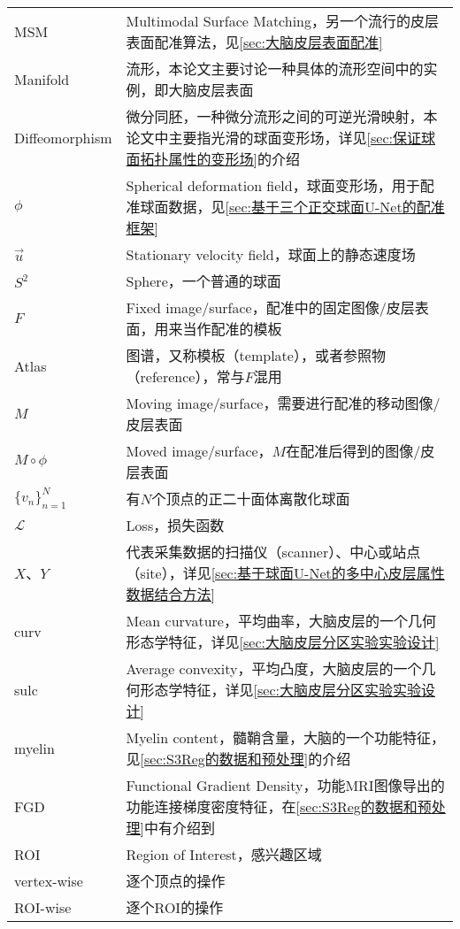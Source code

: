 \begin{center}
\begin{longtable}{>{\raggedleft}p{}  p{}}
            MSM & Multimodal Surface Matching，另一个流行的皮层表面配准算法，见\ref{sec:大脑皮层表面配准} \\
            Manifold & 流形，本论文主要讨论一种具体的流形空间中的实例，即大脑皮层表面 \\
            Diffeomorphism & 微分同胚，一种微分流形之间的可逆光滑映射，本论文中主要指光滑的球面变形场，详见\ref{sec:保证球面拓扑属性的变形场}的介绍 \\
            $\phi$  & Spherical deformation field，球面变形场，用于配准球面数据，见\ref{sec:基于三个正交球面U-Net的配准框架} \\
            $\overrightarrow{u}$ &  Stationary velocity field，球面上的静态速度场 \\
            $S^2$ & Sphere，一个普通的球面 \\
            $F$ & Fixed image/surface，配准中的固定图像/皮层表面，用来当作配准的模板 \\
            Atlas & 图谱，又称模板（template），或者参照物（reference），常与$F$混用 \\
            $M$ & Moving image/surface，需要进行配准的移动图像/皮层表面 \\
            $M\circ \phi$ & Moved image/surface，$M$在配准后得到的图像/皮层表面 \\
            ${\{v_n\}}_{n=1}^N$ & 有$N$个顶点的正二十面体离散化球面 \\
            $\mathcal{L}$ & Loss，损失函数 \\
            $X$、$Y$ & 代表采集数据的扫描仪（scanner）、中心或站点（site），详见\ref{sec:基于球面U-Net的多中心皮层属性数据结合方法} \\
            curv      &    Mean curvature，平均曲率，大脑皮层的一个几何形态学特征，详见\ref{sec:大脑皮层分区实验实验设计} \\
            sulc      & Average convexity，平均凸度，大脑皮层的一个几何形态学特征，详见\ref{sec:大脑皮层分区实验实验设计} \\
            myelin   & Myelin content，髓鞘含量，大脑的一个功能特征，见\ref{sec:S3Reg的数据和预处理}的介绍 \\
            FGD     & Functional Gradient Density，功能MRI图像导出的功能连接梯度密度特征，在\ref{sec:S3Reg的数据和预处理}中有介绍到 \\
            ROI    &  Region of Interest，感兴趣区域 \\
            vertex-wise &  逐个顶点的操作 \\
            ROI-wise &  逐个ROI的操作 \\

\end{longtable}
\end{center}
